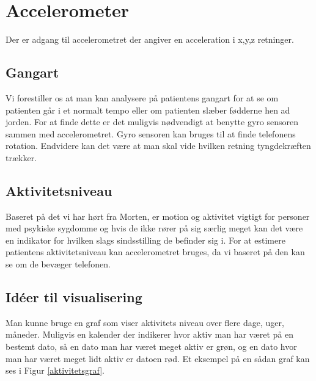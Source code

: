 \section{Accelerometer}
Der er adgang til accelerometret der angiver en acceleration i x,y,z retninger.

\subsection{Gangart}
Vi forestiller os at man kan analysere på patientens gangart for at se om patienten går i et normalt tempo eller om patienten slæber fødderne hen ad jorden.
For at finde dette er det muligvis nødvendigt at benytte gyro sensoren sammen med accelerometret.
Gyro sensoren kan bruges til at finde telefonens rotation.
Endvidere kan det være at man skal vide hvilken retning tyngdekræften trækker.

\subsection{Aktivitetsniveau}
Baseret på det vi har hørt fra Morten, er motion og aktivitet vigtigt for personer med psykiske sygdomme og hvis de ikke rører på sig særlig meget kan det være en indikator for hvilken slags sindsstilling de befinder sig i.
For at estimere patientens aktivitetsniveau kan accelerometret bruges, da vi baseret på den kan se om de bevæger telefonen. 



\subsection{Idéer til visualisering} 
Man kunne bruge en graf som viser aktivitets niveau over flere dage, uger, måneder. Muligvis en kalender der indikerer hvor aktiv man har været på en bestemt dato, så en dato man har været meget aktiv er grøn, og en dato hvor man har været meget lidt aktiv er datoen rød. Et eksempel på en sådan graf kan ses i Figur \ref{aktivitetsgraf}.

